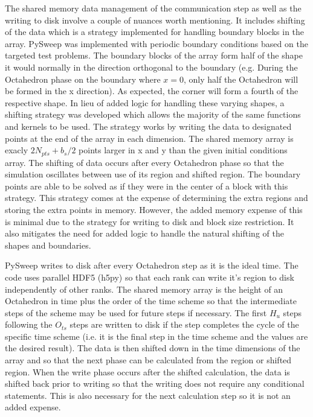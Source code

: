 \documentclass[review]{elsarticle}
\begin{document}
\par The shared memory data management of the communication step as well as the writing to disk involve a couple of nuances worth mentioning. It includes shifting of the data which is a strategy implemented for handling boundary blocks in the array. PySweep was implemented with periodic boundary conditions based on the targeted test problems. The boundary blocks of the array form half of the shape it would normally in the direction orthogonal to the boundary (e.g. During the Octahedron phase on the boundary where $x=0$, only half the Octahedron will be formed in the x direction). As expected, the corner will form a fourth of the respective shape. In lieu of added logic for handling these varying shapes, a shifting strategy was developed which allows the majority of the same functions and kernels to be used. The strategy works by writing the data to designated points at the end of the array in each dimension. The shared memory array is exacly $2N_{pts}+b_{s}/2$ points larger in x and y than the given initial conditions array. The shifting of data occurs after every Octahedron phase so that the simulation oscillates between use of its region and shifted region. The boundary points are able to be solved as if they were in the center of a block with this strategy. This strategy comes at the expense of determining the extra regions and storing the extra points in memory. However, the added memory expense of this is minimal due to the strategy for writing to disk and block size restriction. It also mitigates the need for added logic to handle the natural shifting of the shapes and boundaries.

\par PySweep writes to disk after every Octahedron step as it is the ideal time. The code uses parallel HDF5 (h5py) so that each rank can write it's region to disk independently of other ranks. The shared memory array is the height of an Octahedron in time plus the order of the time scheme so that the intermediate steps of the scheme may be used for future steps if necessary. The first $H_{u}$ steps following the $O_{ts}$ steps are written to disk if the step completes the cycle of the specific time scheme (i.e. it is the final step in the time scheme and the values are the desired result). The data is then shifted down in the time dimensions of the array and so that the next phase can be calculated from the region or shifted region. When the write phase occurs after the shifted calculation, the data is shifted back prior to writing so that the writing does not require any conditional statements. This is also necessary for the next calculation step so it is not an added expense.
\end{document}
